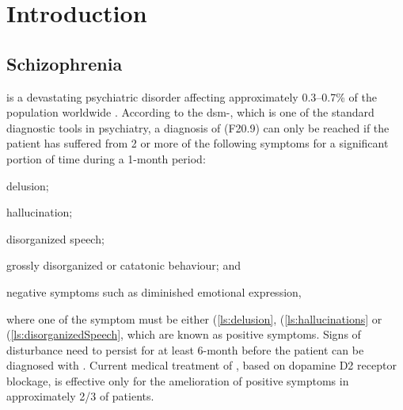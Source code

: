 	\chapter{Introduction}
	\section{Schizophrenia}
	 is a devastating psychiatric disorder affecting approximately 0.3--0.7\% of the population worldwide \citep{AmericanPsychiatricAssociation2013}.
	According to the \gls{dsm}-, which is one of the standard diagnostic tools in psychiatry, a diagnosis of  (F20.9) can only be reached if the patient has suffered from 2 or more of the following symptoms for a significant portion of time during a 1-month period: 
	\begin{enumerate*}[label=\arabic*\upshape)]
		\item delusion; \label{ls:delusion}
		\item hallucination;\label{ls:hallucinations}
		\item disorganized speech;\label{ls:disorganizedSpeech}
		\item grossly disorganized or catatonic behaviour; and\label{ls:catatonicBehavior}
		\item negative symptoms such as diminished emotional expression,\label{ls:negativeSymptoms}
	\end{enumerate*}  where one of the symptom must be either (\ref{ls:delusion}, (\ref{ls:hallucinations} or (\ref{ls:disorganizedSpeech}, which are known as positive symptoms.
	Signs of disturbance need to persist for at least 6-month before the patient can be diagnosed with .
	Current medical treatment of , based on dopamine D2 receptor blockage, is effective only for the amelioration of positive symptoms in approximately 2/3 of patients.
	
